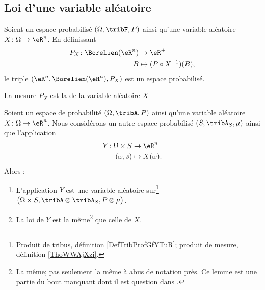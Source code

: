 \subsection{Loi d'une variable aléatoire}

\begin{propositionDef}        \label{DEFooBKJVooRJdMeA}
	Soient un espace probabilisé \( (\Omega,\tribF,P)\) ainsi qu'une variable aléatoire \( X\colon \Omega\to \eR^n\). En définissant
	\begin{equation}
		\begin{aligned}
			P_X\colon \Borelien(\eR^n) & \to \eR^+                   \\
			B                          & \mapsto (P\circ X^{-1})(B),
		\end{aligned}
	\end{equation}
	le triple \( (\eR^n,\Borelien(\eR^n),P_X)\) est un espace probabilisé.

	La mesure \( P_X\) est la  de la variable aléatoire \( X\)
\end{propositionDef}

\begin{lemma}       \label{LEMooHVFJooBDZYnT}
	Soient un espace de probabilité \( (\Omega,\tribA,P)\) ainsi qu'une variable aléatoire \( X\colon \Omega\to \eR^n\). Nous considérons un autre espace probabilisé \( (S,\tribA_S,\mu)\) ainsi que l'application
	\begin{equation}
		\begin{aligned}
			Y\colon \Omega\times S & \to \eR^n          \\
			(\omega,s)             & \mapsto X(\omega).
		\end{aligned}
	\end{equation}
	Alors :
	\begin{enumerate}
		\item   \label{ITEMooDSIKooSqdyJb}
		      L'application \( Y\) est une variable aléatoire sur\footnote{Produit de tribus, définition \ref{DefTribProfGfYTuR}; produit de mesure, définition \ref{ThoWWAjXzi}.} \( \big( \Omega\times S,\tribA\otimes\tribA_S,P\otimes\mu \big)\).
		\item   \label{ITEMooQMMHooPcGKoD}
		      La loi de \( Y\) est la même\footnote{La même; pas seulement la même à abus de notation près. Ce lemme est une partie du bout manquant dont il est question dans \cite{BIBooWPRAooVIOYhF}.} que celle de \( X\).
	\end{enumerate}
\end{lemma}


